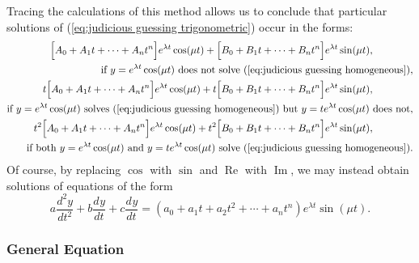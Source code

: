 \documentclass{myart}
\newcommand{\eq}[1]{(\ref{eq:#1})}
\newcommand{\deriv}[3][]{\frac{d^{#1}#2}{d#3^{#1}}}
\DeclareMathOperator{\OpRe}{Re}
\DeclareMathOperator{\OpIm}{Im}
\begin{document}
Tracing the calculations of this method allows us to conclude that particular solutions of \eq{judicious guessing trigonometric} occur in the forms:
\begin{align*}
\Big[A_0 + A_1t + \cdots + A_nt^n\Big] e^{\lambda t} \cos(\mu t) + \Big[B_0 + B_1t + \cdots + B_nt^n\Big] e^{\lambda t} \sin(\mu t), \qquad \qquad \\
\text{if $y = e^{\lambda t} \cos(\mu t)$ does not solve \eq{judicious guessing homogeneous}}, \\
t\Big[A_0 + A_1t + \cdots + A_nt^n\Big] e^{\lambda t} \cos(\mu t) + t\Big[B_0 + B_1t + \cdots + B_nt^n\Big] e^{\lambda t} \sin(\mu t), \qquad \qquad \\
\text{if $y = e^{\lambda t} \cos(\mu t)$ solves \eq{judicious guessing homogeneous} but $y = te^{\lambda t} \cos(\mu t)$ does not}, \\
t^2\Big[A_0 + A_1t + \cdots + A_nt^n\Big] e^{\lambda t} \cos(\mu t) + t^2\Big[B_0 + B_1t + \cdots + B_nt^n\Big] e^{\lambda t} \sin(\mu t), \qquad \qquad \\
\text{if both $y = e^{\lambda t} \cos(\mu t)$ and $y = te^{\lambda t} \cos(\mu t)$ solve \eq{judicious guessing homogeneous}}.
\end{align*}
Of course, by replacing $\cos$ with $\sin$ and $\OpRe$ with $\OpIm$, we may instead obtain solutions of equations of the form
\begin{equation*}
a \deriv[2]{y}{t} + b \deriv{y}{t} + c \deriv{y}{t} = (a_0 + a_1t + a_2t^2 + \cdots + a_nt^n) e^{\lambda t} \sin(\mu t).
\end{equation*}

\subsubsection{General Equation} \label{subsubsec:judicious guessing general}
\end{document}
